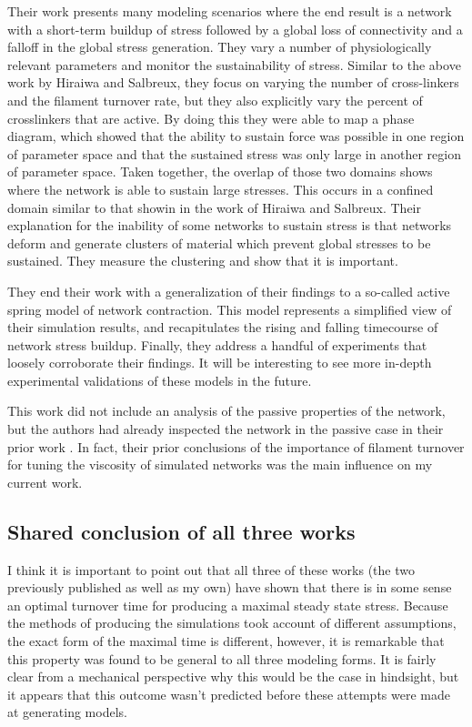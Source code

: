 Their work presents many modeling scenarios where the end result is a network with a short-term buildup of stress followed by a global loss of connectivity and a falloff in the global stress generation.  They vary a number of physiologically relevant parameters and monitor the sustainability of stress.  Similar to the above work by Hiraiwa and Salbreux, they focus on varying the number of cross-linkers and the filament turnover rate, but they also explicitly vary the percent of crosslinkers that are active.  By doing this they were able to map a phase diagram, which showed that the ability to sustain force was possible in one region of parameter space and that the sustained stress was only large in another region of parameter space.  Taken together, the overlap of those two domains shows where the network is able to sustain large stresses.  This occurs in a confined domain similar to that showin in the work of Hiraiwa and Salbreux. Their explanation for the inability of some networks to sustain stress is that networks deform and generate clusters of material which prevent global stresses to be sustained.  They measure the clustering and show that it is important. 

They end their work with a generalization of their findings to a so-called active spring model of network contraction.  This model represents a simplified view of their simulation results, and recapitulates the rising and falling timecourse of network stress buildup.  Finally, they address a handful of experiments that loosely corroborate their findings.  It will be interesting to see more in-depth experimental validations of these models in the future.

This work did not include an analysis of the passive properties of the network, but the authors had already inspected the network in the passive case in their prior work \cite{Kim2014526}.  In fact, their prior conclusions of the importance of filament turnover for tuning the viscosity of simulated networks was the main influence on my current work.

\subsection{Shared conclusion of all three works}
I think it is important to point out that all three of these works (the two previously published as well as my own) have shown that there is in some sense an optimal turnover time for producing a maximal steady state stress.  Because the methods of producing the simulations took account of different assumptions, the exact form of the maximal time is different, however, it is remarkable that this property was found to be general to all three modeling forms.  It is fairly clear from a mechanical perspective why this would be the case in hindsight, but it appears that this outcome wasn't predicted before these attempts were made at generating models.


